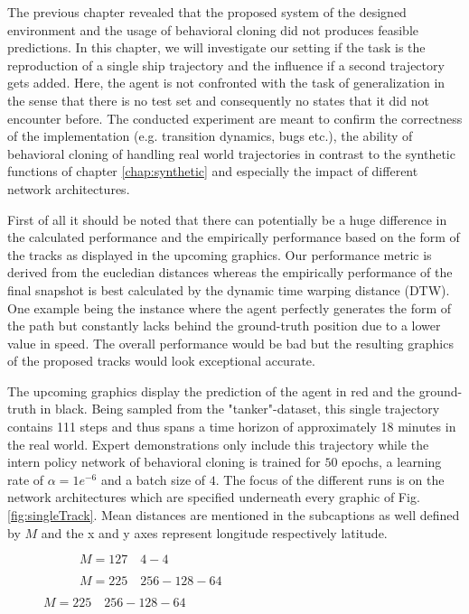 The previous chapter revealed that the proposed system of the designed environment and the usage of behavioral cloning did not produces feasible predictions. In this chapter, we will investigate our setting if the task is the reproduction of a single ship trajectory and the influence if a second trajectory gets added. Here, the agent is not confronted with the task of generalization in the sense that there is no test set and consequently no states that it did not encounter before. The conducted experiment are meant to confirm the correctness of the implementation (e.g. transition dynamics, bugs etc.), the ability of behavioral cloning of handling real world trajectories in contrast to the synthetic functions of chapter \ref{chap:synthetic} and especially the impact of different network architectures.
\par
First of all it should be noted that there can potentially be a huge difference in the calculated performance and the empirically performance based on the form of the tracks as displayed in the upcoming graphics. Our performance metric is derived from the eucledian distances whereas the empirically performance of the final snapshot is best calculated by the dynamic time warping distance (DTW). One example being the instance where the agent perfectly generates the form of the path but constantly lacks behind the ground-truth position due to a lower value in speed. The overall performance would be bad but the resulting graphics of the proposed tracks would look exceptional accurate.
\par
The upcoming graphics display the prediction of the agent in red and the ground-truth in black. Being sampled from the "tanker"-dataset, this single trajectory contains 111 steps and thus spans a time horizon of approximately 18 minutes in the real world. Expert demonstrations only include this trajectory while the intern policy network of behavioral cloning is trained for $50$ epochs, a learning rate of $\alpha = 1e^{-6}$ and a batch size of $4$. The focus of the different runs is on the network architectures which are specified underneath every graphic of Fig. \ref{fig:singleTrack}. Mean distances are mentioned in the subcaptions as well defined by $M$ and the x and y axes represent longitude respectively latitude.
\begin{figure}[H]
     \centering
     \begin{subfigure}[b]{0.48\textwidth}
         \centering
       
         \caption{$M=127 \quad 4-4$}
         \label{fig:single1}
     \end{subfigure}
     \hfill
     \begin{subfigure}[b]{0.48\textwidth}
         \centering
             
         \caption{$M=225 \quad 256-128-64$}
         \label{fig:single2}
     \end{subfigure}
\end{figure}
